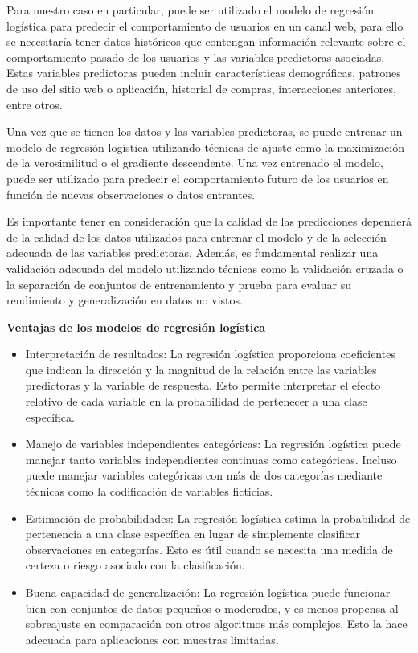 Para nuestro caso en particular, puede ser utilizado el modelo de regresión logística para predecir el comportamiento de usuarios en un canal web, para ello se necesitaría tener datos históricos que contengan información relevante sobre el comportamiento pasado de los usuarios y las variables predictoras asociadas. Estas variables predictoras pueden incluir características demográficas, patrones de uso del sitio web o aplicación, historial de compras, interacciones anteriores, entre otros.

Una vez que se tienen los datos y las variables predictoras, se puede entrenar un modelo de regresión logística utilizando técnicas de ajuste como la maximización de la verosimilitud o el gradiente descendente. Una vez entrenado el modelo, puede ser utilizado para predecir el comportamiento futuro de los usuarios en función de nuevas observaciones o datos entrantes.

Es importante tener en consideración que la calidad de las predicciones dependerá de la calidad de los datos utilizados para entrenar el modelo y de la selección adecuada de las variables predictoras. Además, es fundamental realizar una validación adecuada del modelo utilizando técnicas como la validación cruzada o la separación de conjuntos de entrenamiento y prueba para evaluar su rendimiento y generalización en datos no vistos.

\textbf{Ventajas de los modelos de regresión logística}

\begin{itemize}
    \item Interpretación de resultados: La regresión logística proporciona coeficientes que indican la dirección y la magnitud de la relación entre las variables predictoras y la variable de respuesta. Esto permite interpretar el efecto relativo de cada variable en la probabilidad de pertenecer a una clase específica.
    \item Manejo de variables independientes categóricas: La regresión logística puede manejar tanto variables independientes continuas como categóricas. Incluso puede manejar variables categóricas con más de dos categorías mediante técnicas como la codificación de variables ficticias.
    \item Estimación de probabilidades: La regresión logística estima la probabilidad de pertenencia a una clase específica en lugar de simplemente clasificar observaciones en categorías. Esto es útil cuando se necesita una medida de certeza o riesgo asociado con la clasificación.
    \item Buena capacidad de generalización: La regresión logística puede funcionar bien con conjuntos de datos pequeños o moderados, y es menos propensa al sobreajuste en comparación con otros algoritmos más complejos. Esto la hace adecuada para aplicaciones con muestras limitadas.    
\end{itemize}

